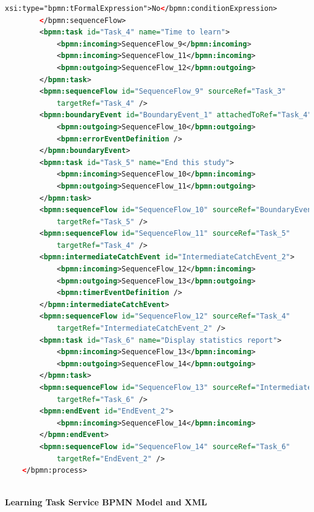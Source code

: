 \documentclass[runningheads]{llncs}
\begin{document}
\begin{lstlisting}[language={XML}]
				xsi:type="bpmn:tFormalExpression">No</bpmn:conditionExpression>
		</bpmn:sequenceFlow>
		<bpmn:task id="Task_4" name="Time to learn">
	        <bpmn:incoming>SequenceFlow_9</bpmn:incoming>
			<bpmn:incoming>SequenceFlow_11</bpmn:incoming>
	        <bpmn:outgoing>SequenceFlow_12</bpmn:outgoing>
	    </bpmn:task>
		<bpmn:sequenceFlow id="SequenceFlow_9" sourceRef="Task_3"
	        targetRef="Task_4" />
		<bpmn:boundaryEvent id="BoundaryEvent_1" attachedToRef="Task_4">
			<bpmn:outgoing>SequenceFlow_10</bpmn:outgoing>
			<bpmn:errorEventDefinition />
		</bpmn:boundaryEvent>
		<bpmn:task id="Task_5" name="End this study">
	        <bpmn:incoming>SequenceFlow_10</bpmn:incoming>
	        <bpmn:outgoing>SequenceFlow_11</bpmn:outgoing>
	    </bpmn:task>
		<bpmn:sequenceFlow id="SequenceFlow_10" sourceRef="BoundaryEvent_1"
	        targetRef="Task_5" />
		<bpmn:sequenceFlow id="SequenceFlow_11" sourceRef="Task_5"
	        targetRef="Task_4" />
		<bpmn:intermediateCatchEvent id="IntermediateCatchEvent_2">
			<bpmn:incoming>SequenceFlow_12</bpmn:incoming>
			<bpmn:outgoing>SequenceFlow_13</bpmn:outgoing>
			<bpmn:timerEventDefinition />
		</bpmn:intermediateCatchEvent>
		<bpmn:sequenceFlow id="SequenceFlow_12" sourceRef="Task_4"
	        targetRef="IntermediateCatchEvent_2" />
		<bpmn:task id="Task_6" name="Display statistics report">
	        <bpmn:incoming>SequenceFlow_13</bpmn:incoming>
	        <bpmn:outgoing>SequenceFlow_14</bpmn:outgoing>
	    </bpmn:task>
		<bpmn:sequenceFlow id="SequenceFlow_13" sourceRef="IntermediateCatchEvent_2"
	        targetRef="Task_6" />
		<bpmn:endEvent id="EndEvent_2">
			<bpmn:incoming>SequenceFlow_14</bpmn:incoming>
		</bpmn:endEvent>
		<bpmn:sequenceFlow id="SequenceFlow_14" sourceRef="Task_6"
	        targetRef="EndEvent_2" />
	</bpmn:process>
	
	\end{lstlisting}
	\clearpage
	\textbf{Learning Task Service BPMN Model and XML}\\
\end{document}
